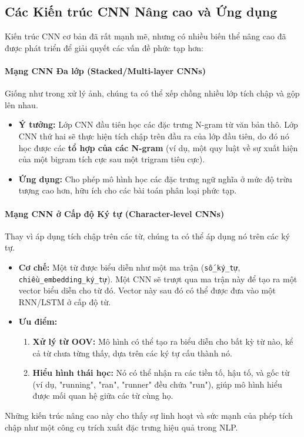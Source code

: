 \subsection{Các Kiến trúc CNN Nâng cao và Ứng dụng}
Kiến trúc CNN cơ bản đã rất mạnh mẽ, nhưng có nhiều biến thể nâng cao đã được phát triển để giải quyết các vấn đề phức tạp hơn:

\paragraph{Mạng CNN Đa lớp (Stacked/Multi-layer CNNs)}
Giống như trong xử lý ảnh, chúng ta có thể xếp chồng nhiều lớp tích chập và gộp lên nhau.
\begin{itemize}
    \item \textbf{Ý tưởng:} Lớp CNN đầu tiên học các đặc trưng N-gram từ văn bản thô. Lớp CNN thứ hai sẽ thực hiện tích chập trên đầu ra của lớp đầu tiên, do đó nó học được các \textbf{tổ hợp của các N-gram} (ví dụ, một quy luật về sự xuất hiện của một bigram tích cực sau một trigram tiêu cực).
    \item \textbf{Ứng dụng:} Cho phép mô hình học các đặc trưng ngữ nghĩa ở mức độ trừu tượng cao hơn, hữu ích cho các bài toán phân loại phức tạp.
\end{itemize}

\paragraph{Mạng CNN ở Cấp độ Ký tự (Character-level CNNs)}
Thay vì áp dụng tích chập trên các từ, chúng ta có thể áp dụng nó trên các ký tự.
\begin{itemize}
    \item \textbf{Cơ chế:} Một từ được biểu diễn như một ma trận (\texttt{số\_ký\_tự}, \texttt{chiều\_embedding\_ký\_tự}). Một CNN sẽ trượt qua ma trận này để tạo ra một vector biểu diễn cho từ đó. Vector này sau đó có thể được đưa vào một RNN/LSTM ở cấp độ từ.
    \item \textbf{Ưu điểm:}
        \begin{enumerate}
            \item \textbf{Xử lý từ OOV:} Mô hình có thể tạo ra biểu diễn cho bất kỳ từ nào, kể cả từ chưa từng thấy, dựa trên các ký tự cấu thành nó.
            \item \textbf{Hiểu hình thái học:} Nó có thể nhận ra các tiền tố, hậu tố, và gốc từ (ví dụ, "running", "ran", "runner" đều chứa "run"), giúp mô hình hiểu được mối quan hệ giữa các từ cùng họ.
        \end{enumerate}
\end{itemize}
Những kiến trúc nâng cao này cho thấy sự linh hoạt và sức mạnh của phép tích chập như một công cụ trích xuất đặc trưng hiệu quả trong NLP.

